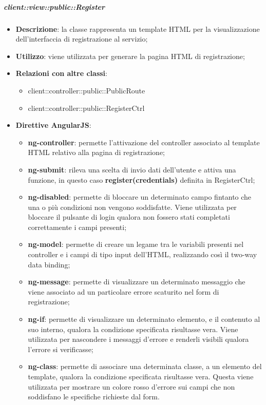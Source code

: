 		\subparagraph{client::view::public::Register} %
		\label{subp:bdsm_app_client_view_public_register}
			\begin{itemize}
				\item \textbf{Descrizione}: la classe rappresenta un template HTML per la visualizzazione dell'interfaccia di registrazione al servizio;
				\item \textbf{Utilizzo}: viene utilizzata per generare la pagina HTML di registrazione;
				\item \textbf{Relazioni con altre classi}:
					\begin{itemize}
						\item client::controller::public::PublicRoute
						\item client::controller::public::RegisterCtrl
					\end{itemize}
				\item \textbf{Direttive AngularJS}:
					\begin{itemize}
						\item \textbf{ng-controller}: permette l'attivazione del controller associato al template HTML relativo alla pagina di registrazione;
						\item \textbf{ng-submit}: rileva una scelta di invio dati dell'utente e attiva una funzione, in questo caso \textbf{register(credentials)} definita in RegisterCtrl;
						\item \textbf{ng-disabled}: permette di bloccare un determinato campo fintanto che una o più condizioni non vengono soddisfatte. Viene utilizzata per bloccare il pulsante di login qualora non fossero stati completati correttamente i campi presenti;
						\item \textbf{ng-model}: permette di creare un legame tra le variabili presenti nel controller e i campi di tipo input dell'HTML, realizzando così il two-way data binding;
						\item \textbf{ng-message}: permette di visualizzare un determinato messaggio che viene associato ad un particolare errore scaturito nel form di registrazione;
						\item \textbf{ng-if}: permette di visualizzare un determinato elemento, e il contenuto al suo interno, qualora la condizione specificata risultasse vera. Viene utilizzata per nascondere i messaggi d'errore e renderli visibili qualora l'errore si verificasse;
						\item \textbf{ng-class}: permette di associare una determinata classe, a un elemento del template, qualora la condizione specificata risultasse vera. Questa viene utilizzata per mostrare un colore rosso d'errore sui campi che non soddisfano le specifiche richieste dal form.
					\end{itemize}
			\end{itemize}

